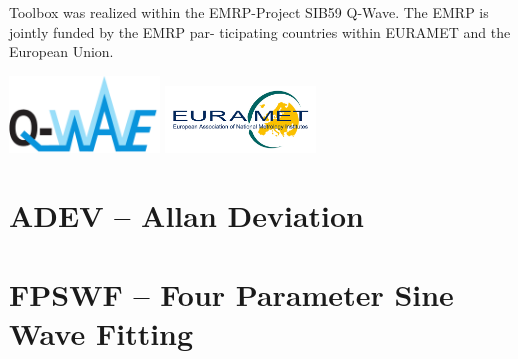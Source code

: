 \documentclass[12pt,a4paper,oneside]{report} %
\begin{document}
Toolbox was realized within the EMRP-Project SIB59 Q-Wave. The EMRP is jointly funded by the EMRP
par- ticipating countries within EURAMET and the European Union.

\vfill
\includegraphics[width=0.3\textwidth]{sources/Q-Wave_logo_01.pdf}
\hfill
\includegraphics[width=0.3\textwidth]{sources/eurametlogo.jpg}

\chapter{ADEV -- Allan Deviation} %
\section*{\infosection} %

\section*{\examplesection} %


\chapter{FPSWF -- Four Parameter Sine Wave Fitting} %
\section*{\infosection} %

\section*{\examplesection} %

\end{document}
